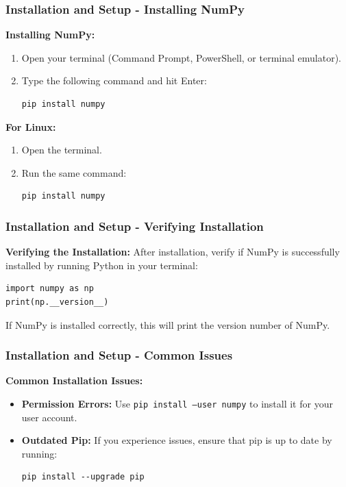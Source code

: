 \documentclass{beamer}
\begin{document}
\begin{frame}[fragile]
    \frametitle{Installation and Setup - Installing NumPy}
    \textbf{Installing NumPy:}
    \begin{enumerate}
        \item Open your terminal (Command Prompt, PowerShell, or terminal emulator).
        \item Type the following command and hit Enter:
        \begin{lstlisting}
pip install numpy
        \end{lstlisting}
    \end{enumerate}
    
    \textbf{For Linux:}
    \begin{enumerate}
        \item Open the terminal.
        \item Run the same command:
        \begin{lstlisting}
pip install numpy
        \end{lstlisting}
    \end{enumerate}
\end{frame}

\begin{frame}[fragile]
    \frametitle{Installation and Setup - Verifying Installation}
    \textbf{Verifying the Installation:}
    After installation, verify if NumPy is successfully installed by running Python in your terminal:
    \begin{lstlisting}
import numpy as np
print(np.__version__)
    \end{lstlisting}
    If NumPy is installed correctly, this will print the version number of NumPy.
\end{frame}

\begin{frame}[fragile]
    \frametitle{Installation and Setup - Common Issues}
    \textbf{Common Installation Issues:}
    \begin{itemize}
        \item \textbf{Permission Errors:} Use \texttt{pip install --user numpy} to install it for your user account.
        \item \textbf{Outdated Pip:} If you experience issues, ensure that pip is up to date by running:
        \begin{lstlisting}
pip install --upgrade pip
        \end{lstlisting}
    \end{itemize}
\end{frame}
\end{document}
